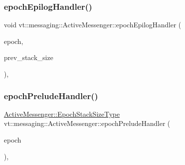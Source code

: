 \subsubsection{\texorpdfstring{epoch\+Epilog\+Handler()}{epochEpilogHandler()}}
{\footnotesize\ttfamily void vt\+::messaging\+::\+Active\+Messenger\+::epoch\+Epilog\+Handler (\begin{DoxyParamCaption}\item[{\hyperlink{namespacevt_a985a5adf291c34a3ca263b3378388236}{Epoch\+Type} const \&}]{epoch,  }\item[{\hyperlink{structvt_1_1messaging_1_1_active_messenger_a447c6c0b3387142fd14b26c12e3ed877}{Epoch\+Stack\+Size\+Type} const \&}]{prev\+\_\+stack\+\_\+size }\end{DoxyParamCaption})\hspace{0.3cm}{\ttfamily [inline]}, {\ttfamily [private]}}

\mbox{\label{structvt_1_1messaging_1_1_active_messenger_a8209c23bddf111089f4fd64d7cd2f67e}} 
\subsubsection{\texorpdfstring{epoch\+Prelude\+Handler()}{epochPreludeHandler()}}
{\footnotesize\ttfamily \hyperlink{structvt_1_1messaging_1_1_active_messenger_a447c6c0b3387142fd14b26c12e3ed877}{Active\+Messenger\+::\+Epoch\+Stack\+Size\+Type} vt\+::messaging\+::\+Active\+Messenger\+::epoch\+Prelude\+Handler (\begin{DoxyParamCaption}\item[{\hyperlink{namespacevt_a985a5adf291c34a3ca263b3378388236}{Epoch\+Type} const \&}]{epoch }\end{DoxyParamCaption})\hspace{0.3cm}{\ttfamily [inline]}, {\ttfamily [private]}}

\mbox{\label{structvt_1_1messaging_1_1_active_messenger_a162667e5566546402f12baf8cf60d4da}} 
